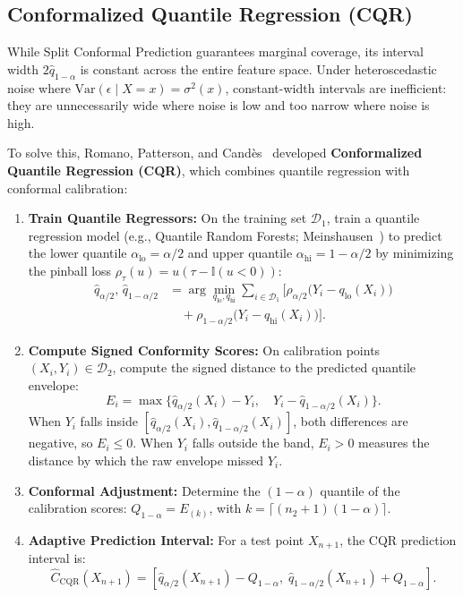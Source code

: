 \documentclass[journal]{IEEEtran}
\begin{document}
\subsection{Conformalized Quantile Regression (CQR)}
While Split Conformal Prediction guarantees marginal coverage, its interval width $2\hat{q}_{1-\alpha}$ is constant across the entire feature space. Under heteroscedastic noise where $\text{Var}(\epsilon \mid X = x) = \sigma^2(x)$, constant-width intervals are inefficient: they are unnecessarily wide where noise is low and too narrow where noise is high.

To solve this, Romano, Patterson, and Cand\`{e}s~\cite{romano2019} developed \textbf{Conformalized Quantile Regression (CQR)}, which combines quantile regression with conformal calibration:
\begin{enumerate}
    \item \textbf{Train Quantile Regressors:} On the training set $\mathcal{D}_1$, train a quantile regression model (e.g., Quantile Random Forests; Meinshausen~\cite{meinshausen2006}) to predict the lower quantile $\alpha_{\text{lo}} = \alpha / 2$ and upper quantile $\alpha_{\text{hi}} = 1 - \alpha / 2$ by minimizing the pinball loss $\rho_\tau(u) = u(\tau - \mathbb{I}(u < 0))$:
    \begin{align}
    \hat{q}_{\alpha/2}, \, \hat{q}_{1-\alpha/2} &= \arg\min_{q_{\text{lo}}, q_{\text{hi}}} \sum_{i \in \mathcal{D}_1} \Big[ \rho_{\alpha/2}\big(Y_i - q_{\text{lo}}(X_i)\big) \nonumber\\
    &\quad + \rho_{1-\alpha/2}\big(Y_i - q_{\text{hi}}(X_i)\big) \Big].
    \end{align}
    \item \textbf{Compute Signed Conformity Scores:} On calibration points $(X_i, Y_i) \in \mathcal{D}_2$, compute the signed distance to the predicted quantile envelope:
    \begin{equation}
    E_i = \max\Big\{ \hat{q}_{\alpha/2}(X_i) - Y_i, \quad Y_i - \hat{q}_{1-\alpha/2}(X_i) \Big\}.
    \end{equation}
    When $Y_i$ falls inside $[\hat{q}_{\alpha/2}(X_i), \hat{q}_{1-\alpha/2}(X_i)]$, both differences are negative, so $E_i \le 0$. When $Y_i$ falls outside the band, $E_i > 0$ measures the distance by which the raw envelope missed $Y_i$.
    \item \textbf{Conformal Adjustment:} Determine the $(1 - \alpha)$ quantile of the calibration scores: $Q_{1-\alpha} = E_{(k)}$, with $k = \lceil (n_2 + 1)(1 - \alpha) \rceil$.
    \item \textbf{Adaptive Prediction Interval:} For a test point $X_{n+1}$, the CQR prediction interval is:
    \begin{equation}
    \hat{C}_{\text{CQR}}(X_{n+1}) = \left[ \hat{q}_{\alpha/2}(X_{n+1}) - Q_{1-\alpha}, \; \hat{q}_{1-\alpha/2}(X_{n+1}) + Q_{1-\alpha} \right].
    \end{equation}
\end{enumerate}
\end{document}
